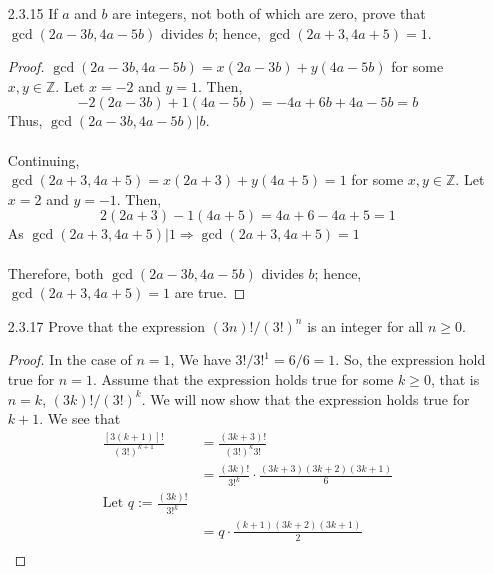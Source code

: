 \documentclass[12pt]{article}
\newcommand{\Z}{\mathds{Z}}
\begin{document}
\begin{enumerate}
\begin{proof}
\begin{enumerate}
\begin{align*}
					(n+1)^3-(n)^3 &= (2k+2)^3-(2k+1)^3 \\
								  &= 12k^2+18k+7 \\
								  &= 2(6k^2+9k+3)+1\\
								  \text{ Let } s:=6k^2+9k+3 \\
								  &= 2s+1 \quad \text{ which is odd}			 	
				\end{align*}
			\end{enumerate}
			As we have shown that in both cases the result from the difference of two consecutive cubes is odd. Therefore the difference of two consecutive cubes is never divisible by 2.
		\end{proof}
	\item[2.3.15] If $a$ and $b$ are integers, not both of which are zero, prove that $\gcd(2a-3b,4a-5b)$ divides $b$; hence, $\gcd(2a+3,4a+5) = 1$.
		\begin{proof}
			$\gcd(2a-3b,4a-5b) = x(2a-3b) + y(4a-5b)$ for some $x,y \in\Z$. Let $x=-2$ and $y=1$. Then,
				\[-2(2a-3b) + 1(4a-5b) = -4a+6b+4a-5b = b\]
			Thus, $\gcd(2a-3b,4a-5b)|b$.\\
			\\
			Continuing, \\
			$\gcd(2a+3,4a+5) = x(2a+3) + y(4a+5) = 1$ for some $x,y\in\Z$. Let $x=2$ and $y=-1$. Then,
				\[2(2a+3)-1(4a+5) = 4a+6-4a+5 = 1\]
			As $\gcd(2a+3,4a+5)|1 \Rightarrow \gcd(2a+3,4a+5) = 1$\\
			\\
			Therefore, both $\gcd(2a-3b,4a-5b)$ divides $b$; hence, $\gcd(2a+3,4a+5) = 1$ are true.
		\end{proof}
	\item[2.3.17] Prove that the expression $(3n)!/(3!)^n$ is an integer for all $n\geq 0$.
		\begin{proof}
			In the case of $n=1$, We have $3!/3!^1 = 6/6 = 1$. So, the expression hold true for $n=1$. Assume that the expression holds true for some $k\geq0$, that is $n=k$, $(3k)!/(3!)^k$. We will now show that the expression holds true for $k+1$. We see that
			\begin{align*}
				\frac{[3(k+1)]!}{(3!)^{k+1}} &= \frac{(3k+3)!}{(3!)^k3!}\\
											 &= \frac{(3k)!}{3!^k}\cdot\frac{(3k+3)(3k+2)(3k+1)}{6}\\
											 \text{Let } q:=\frac{(3k)!}{3!^k}\\
											 &= q\cdot\frac{(k+1)(3k+2)(3k+1)}{2} \\
			\end{align*}

\end{proof}
\end{enumerate}
\end{document}
